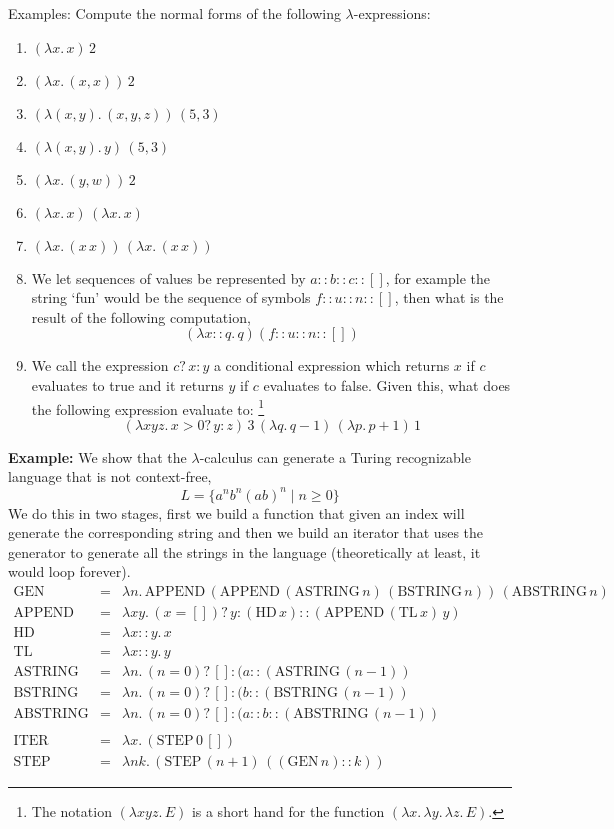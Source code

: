 \documentclass[a4paper,blends,pdf,colorBG,slideColor]{prosper}
\begin{document}
\scriptsize
Examples:  Compute the normal forms of the following $\lambda$-expressions:
\begin{enumerate}
\item $(\lambda x.\, x)\, 2$
\item $(\lambda x.\, (x, x))\, 2$
\item $(\lambda (x, y).\, (x, y, z))\, (5, 3)$
\item $(\lambda (x, y).\, y)\, (5, 3)$
\item $(\lambda x.\, (y, w))\, 2$
\item $(\lambda x.\, x)\, (\lambda x.\, x)$
\item $(\lambda x.\, (x\, x))\, (\lambda x.\,(x\, x))$
\item We let sequences of values be represented by $a::b::c::[]$, for example the string `fun' would be the
sequence of symbols $f::u::n::[]$, then what is the result of the following computation,
\[
(\lambda x::q.\, q) (f::u::n::[])
\]
\item We call the expression $c ?\, x : y$ a conditional expression which returns $x$ if $c$ evaluates to true and
it returns $y$ if $c$ evaluates to false.  Given this, what does the following expression evaluate to:
\footnote{The notation $(\lambda x y z.\, E)$ is a short hand for the function $(\lambda x.\, \lambda y.\, \lambda z.\, E)$.}
\[
(\lambda x y z.\, x > 0 ?\, y : z)\, 3\,  (\lambda q.\, q - 1)\, (\lambda p.\, p + 1)\, 1
\]
\end{enumerate}
\es

\scriptsize
{\bf Example:} We show that the $\lambda$-calculus can generate a Turing recognizable language that is not context-free,
\[
L = \{ a^nb^n(ab)^n \mid n \ge 0\}
\]
We do this in two stages, first we build a function that given an index will generate the corresponding string and then
we build an iterator that uses the generator to generate all the strings in the language (theoretically at least, it would loop 
forever).
\begin{eqnarray*}
\mbox{GEN} &=& \lambda n.\, \mbox{APPEND}\, (\mbox{APPEND}\, (\mbox{ASTRING}\, n)\, (\mbox{BSTRING}\, n))\,(\mbox{ABSTRING}\, n)\\
\mbox{APPEND} &=& \lambda x y.\, (x = []) ?\, y : (\mbox{HD} \, x):: (\mbox{APPEND}\, (\mbox{TL}\, x)\, y)\\
\mbox{HD} &=& \lambda x::y.\, x\\
\mbox{TL} &=& \lambda x::y.\, y\\
\mbox{ASTRING} &=& \lambda n.\, (n=0)?\, [] : (a :: (\mbox{ASTRING}\, (n - 1))\\
\mbox{BSTRING} &=& \lambda n.\, (n=0)?\, [] : (b :: (\mbox{BSTRING}\, (n - 1))\\
\mbox{ABSTRING} &=& \lambda n.\, (n=0)?\, [] : (a :: b :: (\mbox{ABSTRING}\, (n - 1))\\
&&\\
\mbox{ITER} &=& \lambda x.\, (\mbox{STEP}\, 0\, [])\\
\mbox{STEP} &=& \lambda n k.\, (\mbox{STEP}\, (n + 1) \, ((\mbox{GEN}\, n)::k))
\end{eqnarray*}
\es
\end{document}

